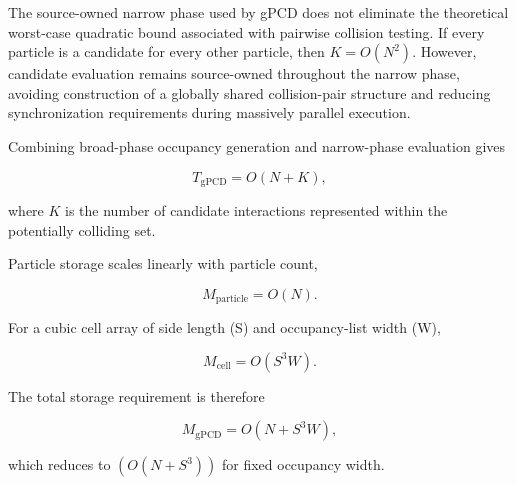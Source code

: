 The source-owned narrow phase used by gPCD does not eliminate the
theoretical worst-case quadratic bound associated with pairwise
collision testing. If every particle is a candidate for every other
particle, then \(K=O(N^2)\). However, candidate evaluation remains
source-owned throughout the narrow phase, avoiding construction of a
globally shared collision-pair structure and reducing synchronization
requirements during massively parallel execution.

Combining broad-phase occupancy generation and narrow-phase evaluation
gives

\begin{equation}
T_{\mathrm{gPCD}} = O(N+K),
\end{equation}

where \(K\) is the number of candidate interactions represented within
the potentially colliding set.

Particle storage scales linearly with particle count,

\begin{equation}
M_{\mathrm{particle}}=O(N).
\end{equation}

For a cubic cell array of side length (S) and occupancy-list width
(W),

\begin{equation}
M_{\mathrm{cell}}=O(S^3W).
\end{equation}

The total storage requirement is therefore

\begin{equation}
M_{\mathrm{gPCD}}=O(N+S^3W),
\end{equation}

which reduces to $(O(N+S^3))$ for fixed occupancy width.




